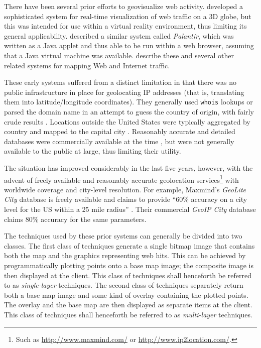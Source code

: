 \documentclass[acmnow]{acmtrans2m}
\begin{document}
There have been several prior efforts to geovisualize web activity.
 developed a sophisticated system for
real-time visualization of web traffic on a 3D globe, but this was
intended for use within a virtual reality environment, thus limiting its
general applicability.  described a similar
system called \emph{Palantir}, which was written as a Java applet and
thus able to be run within a web browser, assuming that a Java virtual
machine was available. 
describe these and several other related systems for mapping Web and
Internet traffic.

These early systems suffered from a distinct limitation in that there
was no public infrastructure in place for geolocating IP addresses (that
is, translating them into latitude/longitude coordinates). They
generally used \texttt{whois} lookups or parsed the domain name in an
attempt to guess the country of origin, with fairly crude results
\cite{Lamm-SE-1996-webvis}. Locations outside the United States were
typically aggregated by country and mapped to the capital city
\cite{Lamm-SE-1996-webvis,Papa-N-1998-Palantir,Jian-B-2000-cybermap}.
Reasonably accurate and detailed databases were commercially available
at the time \cite[p.\ 1466]{Lamm-SE-1996-webvis}, but were not generally
available to the public at large, thus limiting their utility.

The situation has improved considerably in the last five years, however,
with the advent of freely available and reasonably accurate geolocation
services\footnote{Such as \url{http://www.maxmind.com/} or
\url{http://www.ip2location.com/}.} with worldwide coverage and
city-level resolution. For example, Maxmind's \emph{GeoLite City}
database is freely available and claims to provide ``60\% accuracy on a
city level for the US within a 25 mile radius''
\cite{Maxm-G-2006-GeoLiteCity}. Their commercial \emph{GeoIP City}
database claims 80\% accuracy for the same parameters.

The techniques used by these prior systems can generally be divided into
two classes. The first class of techniques generate a single bitmap
image that contains both the map and the graphics representing web hits.
This can be achieved by programmatically plotting points onto a base map
image; the composite image is then displayed at the client. This class
of techniques shall henceforth be referred to as \emph{single-layer}
techniques. The second class of techniques separately return both a base
map image and some kind of overlay containing the plotted points. The
overlay and the base map are then displayed as separate items at the
client. This class of techniques shall henceforth be referred to as
\emph{multi-layer} techniques.
\end{document}
